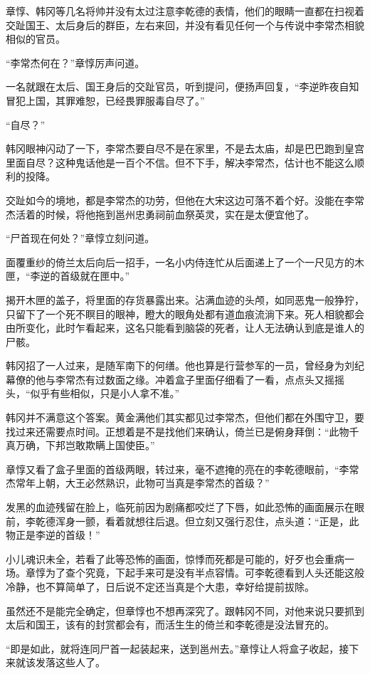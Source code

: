 章惇、韩冈等几名将帅并没有太过注意李乾德的表情，他们的眼睛一直都在扫视着交趾国王、太后身后的群臣，左右来回，并没有看见任何一个与传说中李常杰相貌相似的官员。

“李常杰何在？”章惇厉声问道。

一名就跟在太后、国王身后的交趾官员，听到提问，便扬声回复，“李逆昨夜自知冒犯上国，其罪难恕，已经畏罪服毒自尽了。”

“自尽？”

韩冈眼神闪动了一下，李常杰要自尽不是在家里，不是去太庙，却是巴巴跑到皇宫里面自尽？这种鬼话他是一百个不信。但不下手，解决李常杰，估计也不能这么顺利的投降。

交趾如今的境地，都是李常杰的功劳，但他在大宋这边可落不着个好。没能在李常杰活着的时候，将他拖到邕州忠勇祠前血祭英灵，实在是太便宜他了。

“尸首现在何处？”章惇立刻问道。

面覆重纱的倚兰太后向后一招手，一名小内侍连忙从后面递上了一个一尺见方的木匣，“李逆的首级就在匣中。”

揭开木匣的盖子，将里面的存货暴露出来。沾满血迹的头颅，如同恶鬼一般狰狞，只留下了一个死不瞑目的眼神，瞪大的眼角处都有道血痕流淌下来。死人相貌都会由所变化，此时乍看起来，这名只能看到脑袋的死者，让人无法确认到底是谁人的尸骸。

韩冈招了一人过来，是随军南下的何缮。他也算是行营参军的一员，曾经身为刘纪幕僚的他与李常杰有过数面之缘。冲着盒子里面仔细看了一看，点点头又摇摇头，“似乎有些相似，只是小人拿不准。”

韩冈并不满意这个答案。黄金满他们其实都见过李常杰，但他们都在外围守卫，要找过来还需要点时间。正想着是不是找他们来确认，倚兰已是俯身拜倒：“此物千真万确，下邦岂敢欺瞒上国使臣。”

章惇又看了盒子里面的首级两眼，转过来，毫不遮掩的亮在的李乾德眼前，“李常杰常年上朝，大王必然熟识，此物可当真是李常杰的首级？”

发黑的血迹残留在脸上，临死前因为剧痛都咬烂了下唇，如此恐怖的画面展示在眼前，李乾德浑身一颤，看着就想往后退。但立刻又强行忍住，点头道：“正是，此物正是李逆的首级！”

小儿魂识未全，若看了此等恐怖的画面，惊悸而死都是可能的，好歹也会重病一场。章惇为了查个究竟，下起手来可是没有半点容情。可李乾德看到人头还能这般冷静，也不算简单了，日后说不定还当真是个大患，幸好给提前拔除。

虽然还不是能完全确定，但章惇也不想再深究了。跟韩冈不同，对他来说只要抓到太后和国王，该有的封赏都会有，而活生生的倚兰和李乾德是没法冒充的。

“即是如此，就将连同尸首一起装起来，送到邕州去。”章惇让人将盒子收起，接下来就该发落这些人了。

